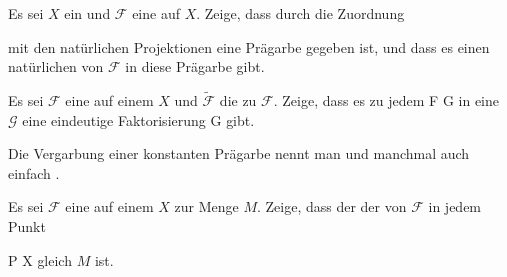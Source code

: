 \setcounter{section}{5}


{}
{





Es sei $X$ ein
und ${ \mathcal  F   }$ eine
auf $X$. Zeige, dass durch die Zuordnung

 {  }

 {} {}
mit den natürlichen Projektionen eine Prägarbe gegeben ist, und dass es einen natürlichen
von ${ \mathcal  F   }$  in diese Prägarbe gibt.





}
{} {}

{}
{





Es sei ${ \mathcal  F   }$ eine
auf einem
$X$ und $\widetilde{  { \mathcal  F   }  }$ die
zu ${ \mathcal  F   }$. Zeige, dass es zu jedem
\maabbdisp {\psi} { { \mathcal  F   }  } { { \mathcal  G   }
} {}
in eine
${ \mathcal  G   }$ eine eindeutige Faktorisierung
\maabbdisp {\tilde{\psi}} {  } { { \mathcal  G   }
} {}
gibt.





}
{} {}

Die Vergarbung einer konstanten Prägarbe nennt man  {} und manchmal auch einfach  {.}

{}
{





Es sei ${ \mathcal  F   }$ eine
auf einem
$X$ zur Menge $M$. Zeige, dass der
der
von ${ \mathcal  F   }$ in jedem Punkt

\mavergleichskette
{\vergleichskette
{P
}
{ \in }{ X
}
{  }{
}
{    }{
}
{   }{
}
}
{}{}{}
gleich $M$ ist.





}
{} {}

